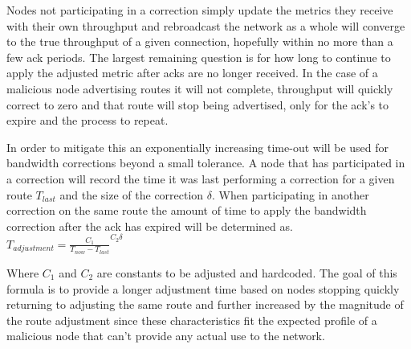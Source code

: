 \documentclass[11pt]{article}
\begin{document}
				Nodes not participating in a correction simply update the metrics they receive with their own throughput and rebroadcast the network as a whole will converge to the true throughput of a given connection, hopefully within no more than a few ack periods. The largest remaining question is for how long to continue to apply the adjusted metric after acks are no longer received. In the case of a malicious node advertising routes it will not complete, throughput will quickly correct to zero and that route will stop being advertised, only for the ack's to expire and the process to repeat. 
				
				In order to mitigate this an exponentially increasing time-out will be used for bandwidth corrections beyond a small tolerance. A node that has participated in a correction will record the time it was last performing a correction for a given route $T_{last}$ and the size of the correction $\delta$. When participating in another correction on the same route the amount of time to apply the bandwidth correction after the ack has expired will be determined as. 
				\newline
				$T_{adjustment} = \frac{C_1}{T_{now} - T_{last}}^{C_2\delta}$
				\newline
				
				Where $C_1$ and  $C_2$ are constants to be adjusted and hardcoded. The goal of this formula is to provide a longer adjustment time based on nodes stopping quickly returning to adjusting the same route and further increased by the magnitude of the route adjustment since these characteristics fit the expected profile of a malicious node that can't provide any actual use to the network.

\medskip
\end{document}
